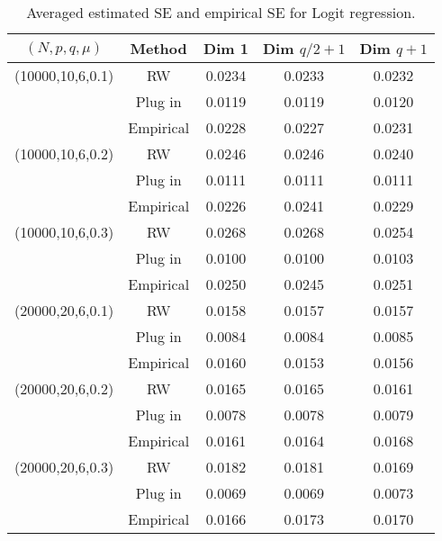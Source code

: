 \documentclass[12pt]{article}
\begin{document}
\begin{table}[!h]
	\centering
	\caption{Averaged estimated SE and empirical SE for Logit regression.}
	\medskip
	\label{tab:sim2-1}
	\begin{tabular}{ccccc}
		\hline
		$(N, p, q, \mu)$ & Method &Dim 1& Dim $q/2+1$ & Dim $q+1$\\
		\hline\hline
		(10000,10,6,0.1) & RW &0.0234 &  0.0233& 0.0232\\
		&Plug in & 0.0119&  0.0119& 0.0120\\
		&Empirical& 0.0228& 0.0227 & 0.0231\\
		\hline
		(10000,10,6,0.2) &  RW & 0.0246&  0.0246& 0.0240\\
		&Plug in & 0.0111&  0.0111& 0.0111\\
		&Empirical& 0.0226&  0.0241& 0.0229\\
		\hline
		(10000,10,6,0.3) & RW & 0.0268&  0.0268& 0.0254\\
		&Plug in & 0.0100& 0.0100& 0.0103\\
		&Empirical& 0.0250&  0.0245& 0.0251\\
		\hline
		(20000,20,6,0.1) & RW & 0.0158&  0.0157& 0.0157\\
		&Plug in & 0.0084& 0.0084 & 0.0085\\
		&Empirical& 0.0160&  0.0153& 0.0156\\
		\hline
		(20000,20,6,0.2)& RW & 0.0165& 0.0165 & 0.0161\\
		&Plug in & 0.0078&  0.0078& 0.0079\\
		&Empirical& 0.0161&  0.0164& 0.0168\\
		\hline
		(20000,20,6,0.3) & RW &0.0182 & 0.0181 & 0.0169\\
		&Plug in & 0.0069&  0.0069& 0.0073\\
		&Empirical& 0.0166&  0.0173& 0.0170\\
		\hline
	\end{tabular}
\end{table}
\end{document}
